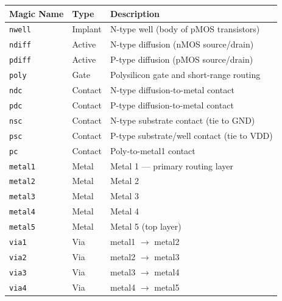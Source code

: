 \documentclass[11pt]{article}
\begin{document}
\begin{center}
\begin{tabular}{@{}llp{7cm}@{}}
\toprule
\textbf{Magic Name} & \textbf{Type} & \textbf{Description} \\
\midrule
\texttt{nwell}   & Implant  & N-type well (body of pMOS transistors) \\
\texttt{ndiff}   & Active   & N-type diffusion (nMOS source/drain) \\
\texttt{pdiff}   & Active   & P-type diffusion (pMOS source/drain) \\
\texttt{poly}    & Gate     & Polysilicon gate and short-range routing \\
\texttt{ndc}     & Contact  & N-type diffusion-to-metal contact \\
\texttt{pdc}     & Contact  & P-type diffusion-to-metal contact \\
\texttt{nsc}     & Contact  & N-type substrate contact (tie to GND) \\
\texttt{psc}     & Contact  & P-type substrate/well contact (tie to VDD) \\
\texttt{pc}      & Contact  & Poly-to-metal1 contact \\
\texttt{metal1}  & Metal    & Metal 1 --- primary routing layer \\
\texttt{metal2}  & Metal    & Metal 2 \\
\texttt{metal3}  & Metal    & Metal 3 \\
\texttt{metal4}  & Metal    & Metal 4 \\
\texttt{metal5}  & Metal    & Metal 5 (top layer) \\
\texttt{via1}    & Via      & metal1 $\rightarrow$ metal2 \\
\texttt{via2}    & Via      & metal2 $\rightarrow$ metal3 \\
\texttt{via3}    & Via      & metal3 $\rightarrow$ metal4 \\
\texttt{via4}    & Via      & metal4 $\rightarrow$ metal5 \\
\bottomrule
\end{tabular}
\end{center}
\end{document}
